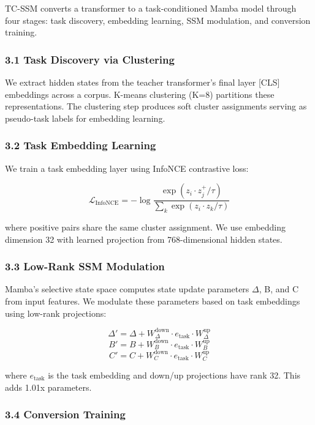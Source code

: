 
TC-SSM converts a transformer to a task-conditioned Mamba model through four stages: task discovery, embedding learning, SSM modulation, and conversion training.

\subsubsection{3.1 Task Discovery via Clustering}

We extract hidden states from the teacher transformer's final layer [CLS] embeddings across a corpus. K-means clustering (K=8) partitions these representations. The clustering step produces soft cluster assignments serving as pseudo-task labels for embedding learning.

\subsubsection{3.2 Task Embedding Learning}

We train a task embedding layer using InfoNCE contrastive loss:

$$\mathcal{L}_{\text{InfoNCE}} = -\log \frac{\exp(z_i \cdot z_j^+ / \tau)}{\sum_k \exp(z_i \cdot z_k / \tau)}$$

where positive pairs share the same cluster assignment. We use embedding dimension 32 with learned projection from 768-dimensional hidden states.

\subsubsection{3.3 Low-Rank SSM Modulation}

Mamba's selective state space computes state update parameters $\Delta$, B, and C from input features. We modulate these parameters based on task embeddings using low-rank projections:

$$\Delta' = \Delta + W_\Delta^{\text{down}} \cdot e_{\text{task}} \cdot W_\Delta^{\text{up}}$$
$$B' = B + W_B^{\text{down}} \cdot e_{\text{task}} \cdot W_B^{\text{up}}$$
$$C' = C + W_C^{\text{down}} \cdot e_{\text{task}} \cdot W_C^{\text{up}}$$

where $e_{\text{task}}$ is the task embedding and down/up projections have rank 32. This adds 1.01x parameters.

\subsubsection{3.4 Conversion Training}

